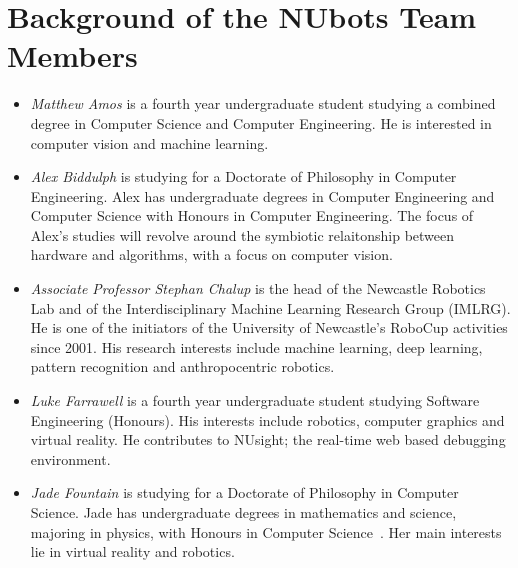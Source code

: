 \documentclass{llncs}
\begin{document}

\section{Background of the NUbots Team Members}

\begin{itemize}


\item \emph{Matthew Amos} is a fourth year undergraduate student studying a combined degree in Computer Science and Computer Engineering. He is interested in computer vision and machine learning.

\item \emph{Alex Biddulph} is studying for a Doctorate of Philosophy in Computer Engineering. Alex has undergraduate degrees in Computer Engineering and Computer Science with Honours in Computer Engineering. The focus of Alex's studies will revolve around the symbiotic relaitonship between hardware and algorithms, with a focus on computer vision.

\item \emph{Associate Professor Stephan Chalup} is the head of the Newcastle Robotics Lab and of the Interdisciplinary Machine Learning Research Group (IMLRG). He is one of the initiators of the University of Newcastle's RoboCup activities since 2001. His research interests include machine learning, deep learning, pattern recognition and anthropocentric robotics.

\item \emph{Luke Farrawell} is a fourth year undergraduate student studying Software Engineering (Honours). His interests include robotics, computer graphics and virtual reality. He contributes to NUsight; the real-time web based debugging environment.

\item \emph{Jade Fountain} is studying for a Doctorate of Philosophy in Computer Science. Jade has undergraduate degrees in mathematics and science, majoring in physics, with Honours in Computer Science~\cite{FountainChalup2015}. Her main interests lie in virtual reality and robotics.


\end{itemize}
\end{document}
